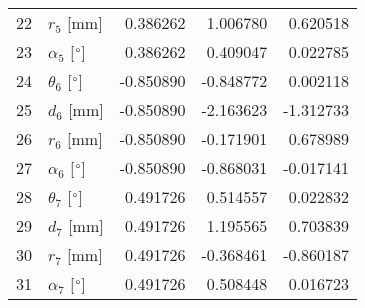 \documentclass{standalone}%
\begin{document}
\begin{tabular}{llrrr}
22 &              $r_{5}$ [mm] &  0.386262 &   1.006780 &   0.620518 \\
23 &  $\alpha_{5}$ [$\degree$] &  0.386262 &   0.409047 &   0.022785 \\
24 &  $\theta_{6}$ [$\degree$] & -0.850890 &  -0.848772 &   0.002118 \\
25 &              $d_{6}$ [mm] & -0.850890 &  -2.163623 &  -1.312733 \\
26 &              $r_{6}$ [mm] & -0.850890 &  -0.171901 &   0.678989 \\
27 &  $\alpha_{6}$ [$\degree$] & -0.850890 &  -0.868031 &  -0.017141 \\
28 &  $\theta_{7}$ [$\degree$] &  0.491726 &   0.514557 &   0.022832 \\
29 &              $d_{7}$ [mm] &  0.491726 &   1.195565 &   0.703839 \\
30 &              $r_{7}$ [mm] &  0.491726 &  -0.368461 &  -0.860187 \\
31 &  $\alpha_{7}$ [$\degree$] &  0.491726 &   0.508448 &   0.016723 \\
\bottomrule
\end{tabular}
%
\end{document}
